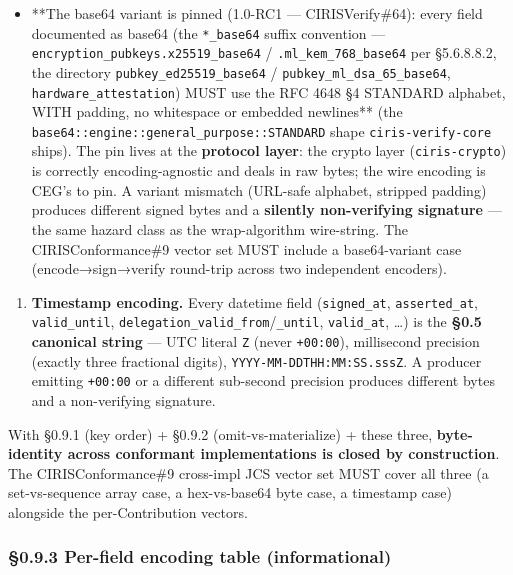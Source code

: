 \documentclass[11pt]{article}
\begin{document}
\begin{itemize}\setlength\itemsep{0pt}
\item **The base64 variant is pinned (1.0-RC1 — CIRISVerify\#64): every field documented as base64 (the \texttt{*\_base64} suffix convention — \texttt{encryption\_pubkeys.x25519\_base64} / \texttt{.ml\_kem\_768\_base64} per §5.6.8.8.2, the directory \texttt{pubkey\_ed25519\_base64} / \texttt{pubkey\_ml\_dsa\_65\_base64}, \texttt{hardware\_attestation}) MUST use the RFC 4648 §4 STANDARD alphabet, WITH padding, no whitespace or embedded newlines** (the \texttt{base64::engine::general\_purpose::STANDARD} shape \texttt{ciris-verify-core} ships). The pin lives at the \textbf{protocol layer}: the crypto layer (\texttt{ciris-crypto}) is correctly encoding-agnostic and deals in raw bytes; the wire encoding is CEG's to pin. A variant mismatch (URL-safe alphabet, stripped padding) produces different signed bytes and a \textbf{silently non-verifying signature} — the same hazard class as the wrap-algorithm wire-string. The CIRISConformance\#9 vector set MUST include a base64-variant case (encode→sign→verify round-trip across two independent encoders).
\end{itemize}

\begin{enumerate}\setlength\itemsep{0pt}
\item \textbf{Timestamp encoding.} Every datetime field (\texttt{signed\_at}, \texttt{asserted\_at}, \texttt{valid\_until}, \texttt{delegation\_valid\_from}/\texttt{\_until}, \texttt{valid\_at}, …) is the \textbf{§0.5 canonical string} — UTC literal \texttt{Z} (never \texttt{+00:00}), millisecond precision (exactly three fractional digits), \texttt{YYYY-MM-DDTHH:MM:SS.sssZ}. A producer emitting \texttt{+00:00} or a different sub-second precision produces different bytes and a non-verifying signature.
\end{enumerate}


With §0.9.1 (key order) + §0.9.2 (omit-vs-materialize) + these three, \textbf{byte-identity across conformant implementations is closed by construction}. The CIRISConformance\#9 cross-impl JCS vector set MUST cover all three (a set-vs-sequence array case, a hex-vs-base64 byte case, a timestamp case) alongside the per-Contribution vectors.


\subsubsection*{§0.9.3 Per-field encoding table (informational)}
\end{document}
